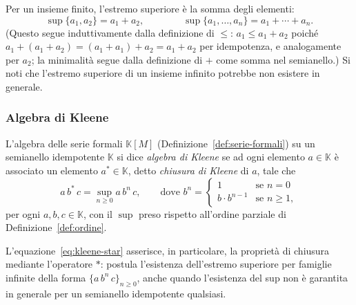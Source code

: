 Per un insieme finito, l'estremo superiore è la somma degli elementi:
\[\sup\{a_1,a_2\} = a_1+a_2, \qquad\qquad \sup\{a_1,\dots,a_n\} = a_1+\cdots+a_n.\]
(Questo segue induttivamente dalla definizione di $\leq$: $a_1\leq a_1+a_2$ poiché $a_1+(a_1+a_2)=(a_1+a_1)+a_2=a_1+a_2$ per idempotenza, e analogamente per $a_2$; la minimalità segue dalla definizione di $+$ come somma nel semianello.)
Si noti che l'estremo superiore di un insieme infinito potrebbe non esistere in generale.

\subsubsection{Algebra di Kleene}
\begin{defi}\label{def:kleene}
L'algebra delle serie formali $\mathbb{K}[M]$ (Definizione~\ref{def:serie-formali}) su un semianello idempotente $\mathbb{K}$ si dice \emph{algebra di Kleene} se ad ogni elemento $a\in\mathbb{K}$ è associato un elemento $a^*\in\mathbb{K}$, detto \emph{chiusura di Kleene} di $a$, tale che
\begin{equation}
a\, b^*\, c = \sup_{n\geq 0} a\, b^n\, c, \qquad \text{dove } b^n =
\begin{cases}
1 & \text{se } n=0 \\
b\cdot b^{n-1} & \text{se } n\geq 1,
\end{cases}
\label{eq:kleene-star}
\end{equation}
per ogni $a,b,c\in\mathbb{K}$, con il $\sup$ preso rispetto all'ordine parziale di Definizione~\ref{def:ordine}.
\end{defi}

L'equazione~\eqref{eq:kleene-star} asserisce, in particolare, la proprietà di chiusura mediante l'operatore $*$: postula l'esistenza dell'estremo superiore per famiglie infinite della forma $\{a\,b^n\,c\}_{n\geq0}$, anche quando l'esistenza del sup non è garantita in generale per un semianello idempotente qualsiasi.